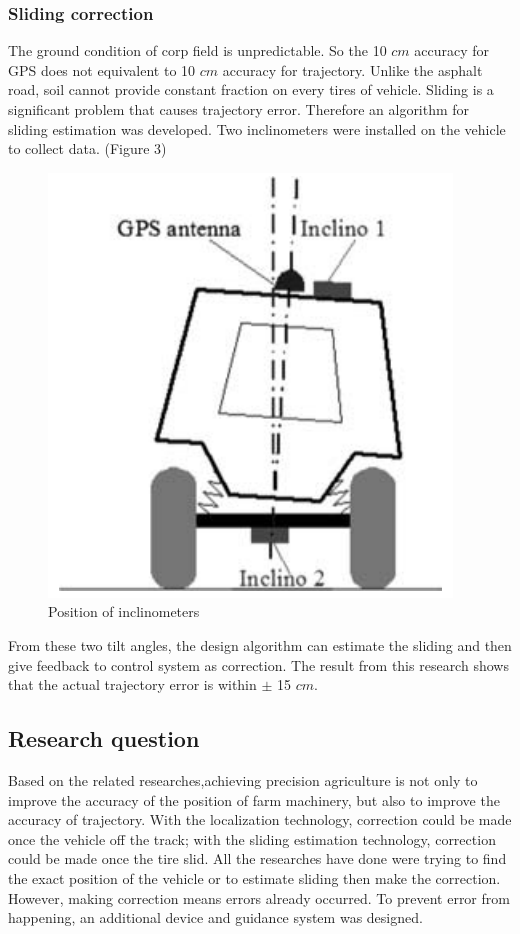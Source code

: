 \documentclass[12pt]{article}
\begin{document}
\begin{flushleft}
\subsubsection{Sliding correction}
The ground condition of corp field is unpredictable. So the 10 $cm$ accuracy for GPS does not equivalent to 10 $cm$ accuracy for trajectory. Unlike the asphalt road, soil cannot provide constant fraction on every tires of vehicle. Sliding is a significant problem that causes trajectory error. Therefore an algorithm for sliding estimation was developed. Two inclinometers were installed on the vehicle to collect data. (Figure 3) 
\begin{figure}[ht!]
	\begin{center}
		\includegraphics[scale = 0.5]{slidingcorrection.png}
		\caption{Position of inclinometers}
	\end{center}
\end{figure}
From these two tilt angles, the design algorithm can estimate the sliding and then give feedback to control system as correction. The result from this research shows that the actual trajectory error is within $\pm$ 15 $cm$. \cite{lenain2006high}

\subsection{Research question}
Based on the related researches,achieving precision agriculture is not only to improve the accuracy of the position of farm machinery, but also to improve the accuracy of trajectory. With the localization technology, correction could be made once the vehicle off the track; with the sliding estimation technology, correction could be made once the tire slid. All the researches have done were trying to find the exact position of the vehicle or to estimate sliding then make the correction. However, making correction means errors already occurred. To prevent error from happening, an additional device and guidance system was designed.  


\end{flushleft}
\end{document}
